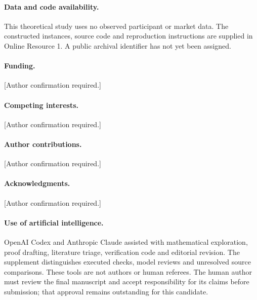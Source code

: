 \documentclass[11pt]{article}
\theoremstyle{remark}\newtheorem{remark}[theorem]{Remark}
\begin{document}
\paragraph{Data and code availability.}
This theoretical study uses no observed participant or market data. The
constructed instances, source code and reproduction instructions are supplied
in Online Resource 1. A public archival identifier has not yet been assigned.
\paragraph{Funding.} [Author confirmation required.]
\paragraph{Competing interests.} [Author confirmation required.]
\paragraph{Author contributions.} [Author confirmation required.]
\paragraph{Acknowledgments.} [Author confirmation required.]
\paragraph{Use of artificial intelligence.}
OpenAI Codex and Anthropic Claude assisted with mathematical exploration,
proof drafting, literature triage, verification code and editorial revision.
The supplement distinguishes executed checks, model reviews and unresolved
source comparisons. These tools are not authors or human referees. The human
author must review the final manuscript and accept responsibility for its
claims before submission; that approval remains outstanding for this candidate.
\end{document}
